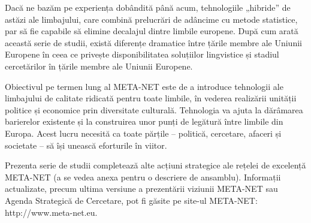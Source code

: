\begin{multicols}{2}

Dacă ne bazăm pe experiența dobândită până acum, tehnologiile „hibride” de astăzi ale limbajului, care combină prelucrări de adâncime cu metode statistice, par să fie capabile să elimine decalajul dintre limbile europene. După cum arată această serie de studii, există diferențe dramatice între țările membre ale Uniunii Europene în ceea ce privește disponibilitatea soluțiilor lingvistice și stadiul cercetărilor în țările membre ale Uniunii Europene.

Obiectivul pe termen lung al META-NET este de a introduce tehnologii ale limbajului de calitate ridicată pentru toate limbile, în vederea realizării unității politice și economice prin diversitate culturală. Tehnologia va ajuta la dărâmarea barierelor existente și la construirea unor punți de legătură între limbile din Europa. Acest lucru necesită ca toate părțile – politică, cercetare, afaceri și societate – să își unească eforturile în viitor.

Prezenta serie de studii completează alte acțiuni strategice ale rețelei de excelență META-NET (a se vedea anexa pentru o descriere de ansamblu). Informații actualizate, precum ultima versiune a prezentării viziunii META-NET \cite{Meta1} sau Agenda Strategică de Cercetare, pot fi găsite pe site-ul META-NET: http://www.meta-net.eu.
\end{multicols}

\clearpage


